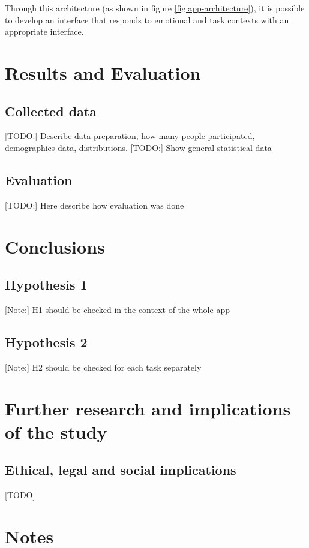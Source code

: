 Through this architecture (as shown in figure \ref{fig:app-architecture}), it is possible to develop an interface that responds to emotional and task contexts with an appropriate interface.

\section{Results and Evaluation}

	\subsection{Collected data}
	
	[TODO:] Describe data preparation, how many people participated, demographics data, distributions.
	[TODO:] Show general statistical data
	
	\subsection{Evaluation}
	
	[TODO:] Here describe how evaluation was done
	
\section{Conclusions}

	\subsection{Hypothesis 1}
	
	[Note:] H1 should be checked in the context of the whole app
	
	\subsection{Hypothesis 2}
	
	[Note:] H2 should be checked for each task separately

\section{Further research and implications of the study} \label{sec:further-research}

\subsection{Ethical, legal and social implications}

[TODO]

\section{Notes}




